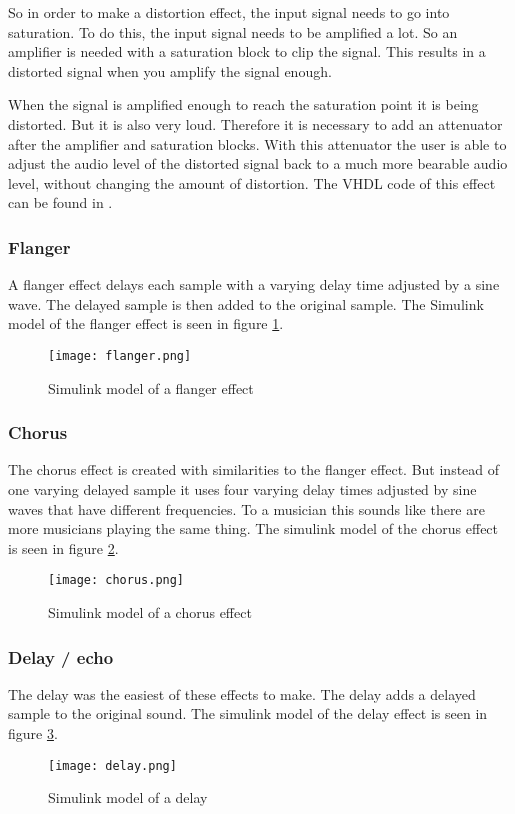 So in order to make a distortion effect, the input signal needs to go into saturation. To do this, the input signal needs to be amplified a lot. So an amplifier is needed with a saturation block to clip the signal. This results in a distorted signal when you amplify the signal enough.

When the signal is amplified enough to reach the saturation point it is being distorted. But it is also very loud. Therefore it is necessary to add an attenuator after the amplifier and saturation blocks. With this attenuator the user is able to adjust the audio level of the distorted signal back to a much more bearable audio level, without changing the amount of distortion. The VHDL code of this effect can be found in .

\subsubsection{Flanger}
A flanger effect delays each sample with a varying delay time adjusted by a sine wave. The delayed sample is then added to the original sample. The Simulink model of the flanger effect is seen in figure \ref{fig:flangersimulink}.

\begin{figure}[ht]
    \centering
    \texttt{[image: flanger.png]}
    \caption{Simulink model of a flanger effect}
    \label{fig:flangersimulink}
\end{figure}

\subsubsection{Chorus}
The chorus effect is created with similarities to the flanger effect. But instead of one varying delayed sample it uses four varying delay times adjusted by sine waves that have different frequencies. To a musician this sounds like there are more musicians playing the same thing. The simulink model of the chorus effect is seen in figure \ref{fig:chorussimulink}.

\begin{figure}[ht]
    \texttt{[image: chorus.png]}
    \caption{Simulink model of a chorus effect}
    \label{fig:chorussimulink}
\end{figure}

\subsubsection{Delay / echo}
The delay was the easiest of these effects to make. The delay adds a delayed sample to the original sound. The simulink model of the delay effect is seen in figure \ref{fig:delaysimulink}.

\begin{figure}[ht]
    \centering
    \texttt{[image: delay.png]}
    \caption{Simulink model of a delay}
    \label{fig:delaysimulink}
\end{figure}

